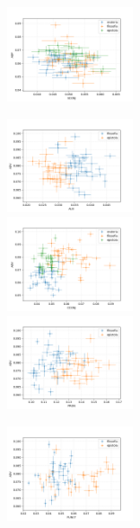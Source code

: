 \documentclass[10pt,a4paper,onecolumn]{article}
\theoremstyle{definition}
\theoremstyle{remark}
\begin{document}
\begin{figure}[htpb!]
\begin{multicols}{3}
		\includegraphics[width=0.33\textwidth]{graficos/ADP_x_SCONJ.png}  \\
	\end{multicols}\vspace{-0.8cm}
	\begin{multicols}{3}
		\includegraphics[width=0.33\textwidth]{graficos/ADV_x_AUX.png}  \\
		\includegraphics[width=0.33\textwidth]{graficos/ADV_x_CCONJ.png}  \\
		\includegraphics[width=0.33\textwidth]{graficos/ADV_x_PRON.png}  \\
	\end{multicols}\vspace{-0.8cm}
	\begin{multicols}{3}
		\includegraphics[width=0.33\textwidth]{graficos/ADV_x_PUNCT.png} \\  \\

\end{multicols}
\end{figure}
\end{document}
